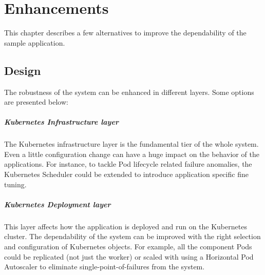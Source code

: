 \chapter{Enhancements} \label{enhancements}

This chapter describes a few alternatives to improve the dependability of the sample application.

\section{Design}


The robustness of the system can be enhanced in different layers. Some options are presented below:

\paragraph{Kubernetes Infrastructure layer} The Kubernetes infrastructure layer is the fundamental tier of the whole system. Even a little configuration change can have a huge impact on the behavior of the applications. For instance, to tackle Pod lifecycle related failure anomalies, the Kubernetes Scheduler could be extended to introduce application specific fine tuning.

\paragraph{Kubernetes Deployment layer} This layer affects how the application is deployed and run on the Kubernetes cluster. The dependability of the system can be improved with the right selection and configuration of Kubernetes objects. For example, all the component Pods could be replicated (not just the worker) or scaled with using a Horizontal Pod Autoscaler to eliminate single-point-of-failures from the system.

